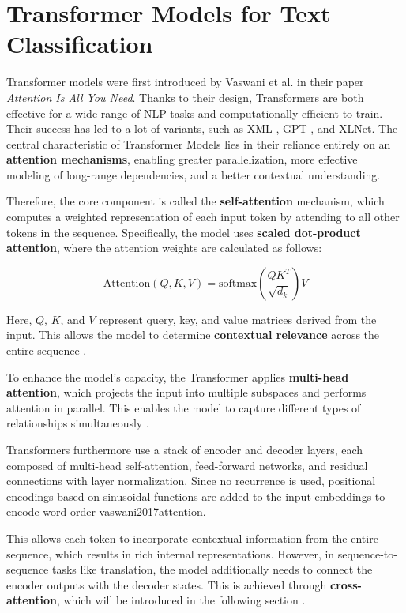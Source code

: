 \section{Transformer Models for Text Classification}

Transformer models were first introduced by Vaswani et al. \parencite{vaswani2017attention} in their paper \textit{Attention Is All You Need}. Thanks to their design, Transformers are both effective for a wide range of NLP tasks and computationally efficient to train. Their success has led to a lot of variants, such as XML \parencite{lample2019cross}, GPT \parencite{radford2018gpt}, and XLNet\parencite{yang2019xlnet}. The central characteristic of Transformer Models lies in their reliance entirely on an \textbf{attention mechanisms}, enabling greater parallelization, more effective modeling of long-range dependencies, and a better contextual understanding. \cite{vaswani2017attention}

Therefore, the core component is called the \textbf{self-attention} mechanism, which computes a weighted representation of each input token by attending to all other tokens in the sequence. Specifically, the model uses \textbf{scaled dot-product attention}, where the attention weights are calculated as follows:

\[
\text{Attention}(Q, K, V) = \text{softmax}\left(\frac{QK^T}{\sqrt{d_k}}\right)V
\]

Here, $Q$, $K$, and $V$ represent query, key, and value matrices derived from the input. This allows the model to determine \textbf{contextual relevance} across the entire sequence \parencite{vaswani2017attention}.

To enhance the model's capacity, the Transformer applies \textbf{multi-head attention}, which projects the input into multiple subspaces and performs attention in parallel. This enables the model to capture different types of relationships simultaneously \parencite{vaswani2017attention}.

Transformers furthermore use a stack of encoder and decoder layers, each composed of multi-head self-attention, feed-forward networks, and residual connections with layer normalization. Since no recurrence is used, positional encodings based on sinusoidal functions are added to the input embeddings to encode word order {vaswani2017attention}.

This allows each token to incorporate contextual information from the entire sequence, which results in rich internal representations. However, in sequence-to-sequence tasks like translation, the model additionally needs to connect the encoder outputs with the decoder states. This is achieved through \textbf{cross-attention}, which will be introduced in the following section \parencite{vaswani2017attention}.

